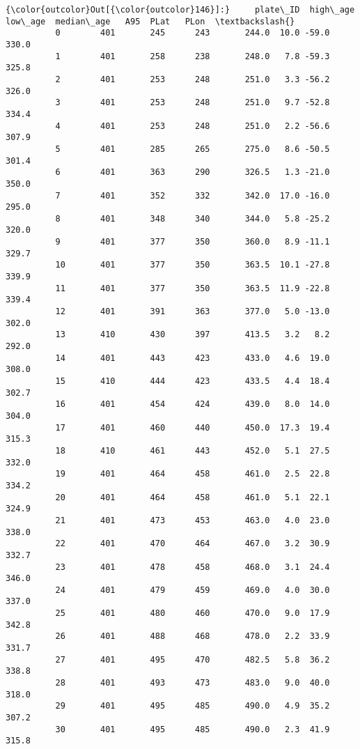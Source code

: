 \documentclass[11pt]{article}
\begin{document}
            \begin{Verbatim}[commandchars=\\\{\}]
{\color{outcolor}Out[{\color{outcolor}146}]:}     plate\_ID  high\_age  low\_age  median\_age   A95  PLat   PLon  \textbackslash{}
          0        401       245      243       244.0  10.0 -59.0  330.0   
          1        401       258      238       248.0   7.8 -59.3  325.8   
          2        401       253      248       251.0   3.3 -56.2  326.0   
          3        401       253      248       251.0   9.7 -52.8  334.4   
          4        401       253      248       251.0   2.2 -56.6  307.9   
          5        401       285      265       275.0   8.6 -50.5  301.4   
          6        401       363      290       326.5   1.3 -21.0  350.0   
          7        401       352      332       342.0  17.0 -16.0  295.0   
          8        401       348      340       344.0   5.8 -25.2  320.0   
          9        401       377      350       360.0   8.9 -11.1  329.7   
          10       401       377      350       363.5  10.1 -27.8  339.9   
          11       401       377      350       363.5  11.9 -22.8  339.4   
          12       401       391      363       377.0   5.0 -13.0  302.0   
          13       410       430      397       413.5   3.2   8.2  292.0   
          14       401       443      423       433.0   4.6  19.0  308.0   
          15       410       444      423       433.5   4.4  18.4  302.7   
          16       401       454      424       439.0   8.0  14.0  304.0   
          17       401       460      440       450.0  17.3  19.4  315.3   
          18       410       461      443       452.0   5.1  27.5  332.0   
          19       401       464      458       461.0   2.5  22.8  334.2   
          20       401       464      458       461.0   5.1  22.1  324.9   
          21       401       473      453       463.0   4.0  23.0  338.0   
          22       401       470      464       467.0   3.2  30.9  332.7   
          23       401       478      458       468.0   3.1  24.4  346.0   
          24       401       479      459       469.0   4.0  30.0  337.0   
          25       401       480      460       470.0   9.0  17.9  342.8   
          26       401       488      468       478.0   2.2  33.9  331.7   
          27       401       495      470       482.5   5.8  36.2  338.8   
          28       401       493      473       483.0   9.0  40.0  318.0   
          29       401       495      485       490.0   4.9  35.2  307.2   
          30       401       495      485       490.0   2.3  41.9  315.8   

\end{Verbatim}
\end{document}
